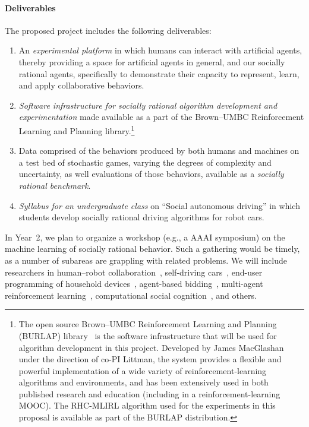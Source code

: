 
\vspace{\up}
\paragraph{Deliverables}

The proposed project includes the following deliverables: 

\begin{enumerate}

\item An {\em experimental platform\/} in which humans can interact
  with artificial agents, thereby providing a space for artificial
  agents in general, and our socially rational agents, specifically to
  demonstrate their capacity to represent, learn, and apply
  collaborative behaviors. %

\item {\em Software infrastructure for socially rational algorithm
  development and experimentation\/} made available as a part of the
  Brown--UMBC Reinforcement Learning and Planning
  library.\footnote{The open source Brown--UMBC Reinforcement Learning
  and Planning (BURLAP) library~\cite{macglashan16} is
  the software infrastructure that will be used for algorithm
  development in this project.  Developed by James MacGlashan under
  the direction of co-PI Littman, the system provides a flexible and
  powerful implementation of a wide variety of reinforcement-learning
  algorithms and environments, and has been extensively used in both
  published research and education (including in a
  reinforcement-learning MOOC).  The RHC-MLIRL algorithm used for the
  experiments in this proposal is available as part of the BURLAP
  distribution.}

\item Data comprised of the behaviors produced by both humans and
  machines on a test bed of stochastic games, varying the degrees of
  complexity and uncertainty, as well evaluations of those behaviors,
  available as a {\em socially rational benchmark}.

\item {\em Syllabus for an undergraduate class} on ``Social autonomous
  driving'' in which students develop socially rational driving
  algorithms for robot cars.

\end{enumerate}

In Year~2, we plan to organize a workshop (e.g., a AAAI symposium)
on the machine learning of socially rational behavior. Such a
gathering would be timely, as a number of subareas are grappling with
related problems. We will include researchers in human--robot
collaboration~\cite{gopalan15}, self-driving
cars~\cite{dolgov2010path}, end-user programming of household
devices~\cite{ur14}, agent-based bidding~\cite{tac:book}, multi-agent
reinforcement learning~\cite{sodomka13}, computational social
cognition~\cite{baker14}, and others.
